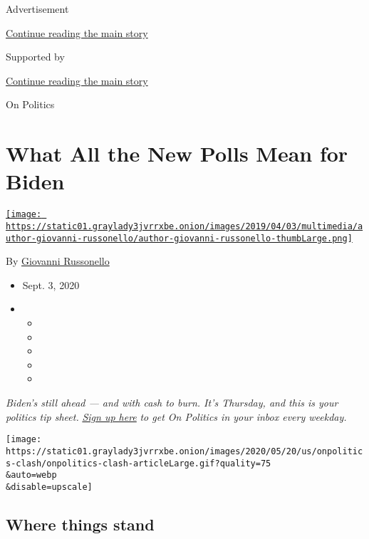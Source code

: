 Advertisement

\protect\hyperlink{after-top}{Continue reading the main story}

Supported by

\protect\hyperlink{after-sponsor}{Continue reading the main story}

On Politics

\hypertarget{what-all-the-new-polls-mean-for-biden}{%
\section{What All the New Polls Mean for
Biden}\label{what-all-the-new-polls-mean-for-biden}}

\href{https://www.nytimes3xbfgragh.onion/by/giovanni-russonello}{\texttt{[image: https://static01.graylady3jvrrxbe.onion/images/2019/04/03/multimedia/author-giovanni-russonello/author-giovanni-russonello-thumbLarge.png]}}

By
\href{https://www.nytimes3xbfgragh.onion/by/giovanni-russonello}{Giovanni
Russonello}

\begin{itemize}
\item
  Sept. 3, 2020
\item
  \begin{itemize}
  \item
  \item
  \item
  \item
  \item
  \end{itemize}
\end{itemize}

\emph{Biden's still ahead --- and with cash to burn. It's Thursday, and
this is your politics tip sheet.}
\href{https://www.nytimes3xbfgragh.onion/newsletters/politics?module=inline}{\emph{Sign
up here}} \emph{to get On Politics in your inbox every weekday.}

\texttt{[image: https://static01.graylady3jvrrxbe.onion/images/2020/05/20/us/onpolitics-clash/onpolitics-clash-articleLarge.gif?quality=75\\\&auto=webp\\\&disable=upscale]}

\hypertarget{where-things-stand}{%
\subsection{Where things stand}\label{where-things-stand}}

